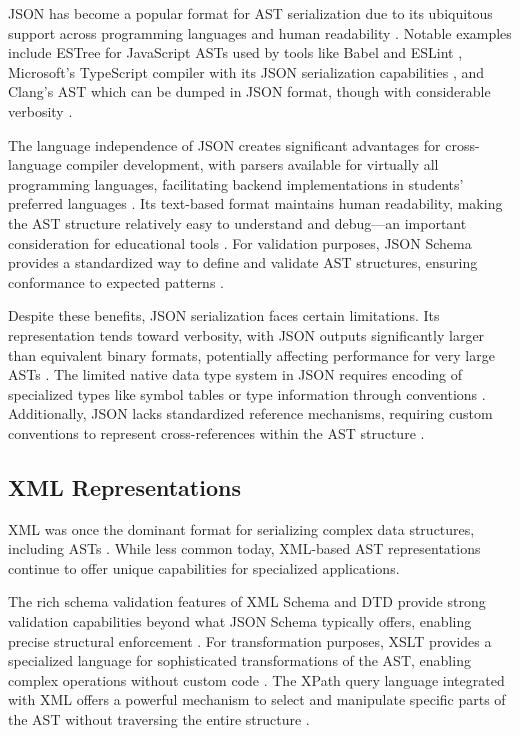 JSON has become a popular format for AST serialization due to its ubiquitous support across programming languages and human readability \cite{crockford2006json}. Notable examples include ESTree for JavaScript ASTs used by tools like Babel and ESLint \cite{babel2015estree}, Microsoft's TypeScript compiler with its JSON serialization capabilities \cite{microsoft2018typescript}, and Clang's AST which can be dumped in JSON format, though with considerable verbosity \cite{lattner2008llvm}.

The language independence of JSON creates significant advantages for cross-language compiler development, with parsers available for virtually all programming languages, facilitating backend implementations in students' preferred languages \cite{crockford2006json}. Its text-based format maintains human readability, making the AST structure relatively easy to understand and debug—an important consideration for educational tools \cite{crockford2006json}. For validation purposes, JSON Schema provides a standardized way to define and validate AST structures, ensuring conformance to expected patterns \cite{jsonschema2019}.

Despite these benefits, JSON serialization faces certain limitations. Its representation tends toward verbosity, with JSON outputs significantly larger than equivalent binary formats, potentially affecting performance for very large ASTs \cite{bray2017json}. The limited native data type system in JSON requires encoding of specialized types like symbol tables or type information through conventions \cite{crockford2006json}. Additionally, JSON lacks standardized reference mechanisms, requiring custom conventions to represent cross-references within the AST structure \cite{bray2017json}.

\subsection{XML Representations}

XML was once the dominant format for serializing complex data structures, including ASTs \cite{bray1997extensible}. While less common today, XML-based AST representations continue to offer unique capabilities for specialized applications.

The rich schema validation features of XML Schema and DTD provide strong validation capabilities beyond what JSON Schema typically offers, enabling precise structural enforcement \cite{bray1997extensible}. For transformation purposes, XSLT provides a specialized language for sophisticated transformations of the AST, enabling complex operations without custom code \cite{kay2000xslt}. The XPath query language integrated with XML offers a powerful mechanism to select and manipulate specific parts of the AST without traversing the entire structure \cite{clark1999xml}.

